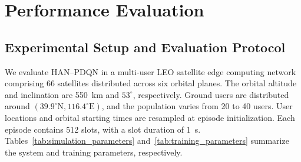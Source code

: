 
\FloatBarrier
{}
\section{Performance Evaluation}
\label{sec:performance_evaluation}

\subsection{Experimental Setup and Evaluation Protocol}
\label{subsec:experimental_setup}

We evaluate HAN--PDQN in a multi-user LEO satellite edge
computing network comprising 66 satellites distributed
across six orbital planes. The orbital altitude and
inclination are 550~km and $53^\circ$, respectively.
Ground users are distributed around
$(39.9^\circ\mathrm{N},116.4^\circ\mathrm{E})$, and the
population varies from 20 to 40 users.
User locations and orbital starting times are resampled
at episode initialization. Each episode contains
512 slots, with a slot duration of 1~s.
Tables~\ref{tab:simulation_parameters} and~\ref{tab:training_parameters}
summarize the system and training parameters, respectively.

